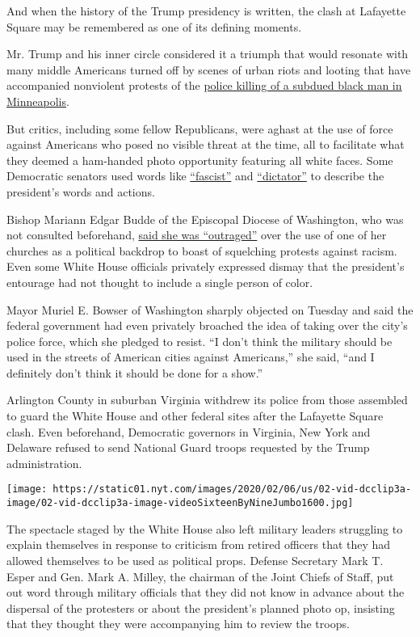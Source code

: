 And when the history of the Trump presidency is written, the clash at
Lafayette Square may be remembered as one of its defining moments.

Mr. Trump and his inner circle considered it a triumph that would
resonate with many middle Americans turned off by scenes of urban riots
and looting that have accompanied nonviolent protests of the
\href{https://www.nytimes.com/2020/05/31/us/george-floyd-investigation.html}{police
killing of a subdued black man in Minneapolis}.

But critics, including some fellow Republicans, were aghast at the use
of force against Americans who posed no visible threat at the time, all
to facilitate what they deemed a ham-handed photo opportunity featuring
all white faces. Some Democratic senators used words like
\href{https://twitter.com/RonWyden/status/1267605801549664256}{``fascist''}
and
\href{https://twitter.com/KamalaHarris/status/1267603100656898049}{``dictator''}
to describe the president's words and actions.

Bishop Mariann Edgar Budde of the Episcopal Diocese of Washington, who
was not consulted beforehand,
\href{https://www.nytimes.com/2020/06/02/us/politics/trump-church.html}{said
she was ``outraged''} over the use of one of her churches as a political
backdrop to boast of squelching protests against racism. Even some White
House officials privately expressed dismay that the president's
entourage had not thought to include a single person of color.

Mayor Muriel E. Bowser of Washington sharply objected on Tuesday and
said the federal government had even privately broached the idea of
taking over the city's police force, which she pledged to resist. ``I
don't think the military should be used in the streets of American
cities against Americans,'' she said, ``and I definitely don't think it
should be done for a show.''

Arlington County in suburban Virginia withdrew its police from those
assembled to guard the White House and other federal sites after the
Lafayette Square clash. Even beforehand, Democratic governors in
Virginia, New York and Delaware refused to send National Guard troops
requested by the Trump administration.

\texttt{[image: https://static01.nyt.com/images/2020/02/06/us/02-vid-dcclip3a-image/02-vid-dcclip3a-image-videoSixteenByNineJumbo1600.jpg]}

The spectacle staged by the White House also left military leaders
struggling to explain themselves in response to criticism from retired
officers that they had allowed themselves to be used as political props.
Defense Secretary Mark T. Esper and Gen. Mark A. Milley, the chairman of
the Joint Chiefs of Staff, put out word through military officials that
they did not know in advance about the dispersal of the protesters or
about the president's planned photo op, insisting that they thought they
were accompanying him to review the troops.


